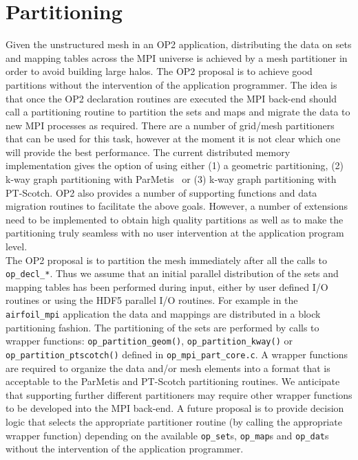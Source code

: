 \documentclass[11pt]{article}
\begin{document}
\section{Partitioning}\label{sec/partitioning}
Given the unstructured mesh in an OP2 application, distributing the data on sets and mapping tables across the MPI
universe is achieved by a mesh partitioner in order to avoid building large halos. The OP2 proposal is to
achieve good partitions without the intervention of the application programmer. The idea is that once the OP2
declaration routines are executed the MPI back-end should call a partitioning routine to partition the sets and maps and
migrate the data to new MPI processes as required. There are a number of grid/mesh partitioners that can be
used for this task, however at the moment it is not clear which one will provide the best performance. The current
distributed memory implementation gives the option of using either (1) a geometric partitioning, (2) k-way graph
partitioning with ParMetis~\cite{ParMETIS} or (3) k-way graph partitioning with PT-Scotch. OP2 also provides a number of
supporting functions and data migration routines to facilitate the above goals. However, a number of extensions need to
be implemented to obtain high quality partitions as well as to make the partitioning truly seamless with no user
intervention at the application program level.\\
\indent The OP2 proposal is to partition the mesh immediately after all the calls to \texttt{op\_decl\_*}. Thus we
assume that an initial parallel distribution of the sets and mapping tables has been performed during input, either by
user defined I/O routines or using the HDF5 parallel I/O routines. For example in the \texttt{airfoil\_mpi} application
the data and mappings are distributed in a block partitioning fashion. The partitioning of the sets are performed by
calls to wrapper functions: \texttt{op\_partition\_geom()}, \texttt{op\_partition\_kway()} or
\texttt{op\_partition\_ptscotch()} defined in \texttt{op\_mpi\_part\_core.c}. A wrapper functions are required to
organize the data and/or mesh elements into a format that is acceptable to the ParMetis and PT-Scotch partitioning
routines. We anticipate that supporting further different partitioners may require other wrapper functions to be
developed into the MPI back-end. A future proposal is to provide decision logic that selects the appropriate partitioner
routine (by calling the appropriate wrapper function) depending on the available \texttt{op\_set}s, \texttt{op\_map}s
and \texttt{op\_dat}s without the intervention of the application programmer.\\
\end{document}
